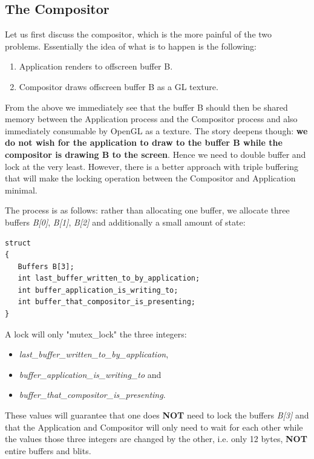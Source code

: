 \documentclass[a4paper,11pt]{article}
\begin{document}
\subsection{The Compositor}
\begin{indenter}{2cm}
  
Let us first discuss the compositor, which is the more painful of the two problems.
Essentially the idea of what is to happen is the following:

\begin{enumerate}
\item Application renders to offscreen buffer B.
\item Compositor draws offscreen buffer B as a GL texture.
\end{enumerate}

From the above we immediately see that the buffer B should
then be shared memory between the Application process and
the Compositor process and also immediately consumable by
OpenGL as a texture. The story deepens though: \textbf{we do not wish
for the application to draw to the buffer B while the compositor
is drawing B to the screen}. Hence we need to double buffer and lock
at the very least. However, there is a better approach with triple
buffering that will make the locking operation between the
Compositor and Application minimal.

The process is as follows: rather than allocating one buffer,
we allocate three buffers \textit{B[0]}, \textit{B[1]}, \textit{B[2]} and additionally a small amount of state:

\begin{verbatim}
struct
{
   Buffers B[3];
   int last_buffer_written_to_by_application;
   int buffer_application_is_writing_to;
   int buffer_that_compositor_is_presenting;
}
\end{verbatim}

A lock will only "mutex\_lock" the three integers:
\begin{itemize}
\item \textit{last\_buffer\_written\_to\_by\_application},
\item \textit{buffer\_application\_is\_writing\_to} and
\item \textit{buffer\_that\_compositor\_is\_presenting}.
\end{itemize}

These values will guarantee that one does \textbf{NOT} need to lock
the buffers \textit{B[3]} and that the Application and Compositor will
only need to wait for each other while the values those three
integers are changed by the other, i.e. only 12 bytes, \textbf{NOT} entire buffers and blits.


\end{indenter}
\end{document}

